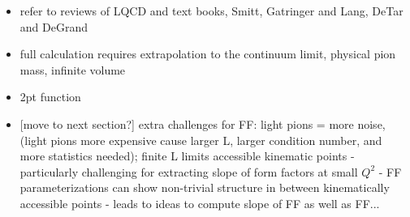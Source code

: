 \begin{itemize}

\item refer to reviews of LQCD and text books, Smitt, Gatringer and Lang, DeTar and DeGrand

\item full calculation requires extrapolation to the continuum limit, physical pion mass, infinite volume

\item 2pt function

\item {\color{red}[move to next section?]} extra challenges for FF: light pions = more noise, (light pions more expensive cause larger L, larger condition number, and more statistics needed); finite L limits accessible kinematic points - particularly challenging for extracting slope of form factors at small $Q^2$ - FF parameterizations can show non-trivial structure in between kinematically accessible points - leads to ideas to compute slope of FF as well as FF...

\end{itemize}
